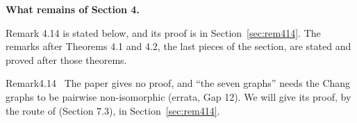 \medskip\noindent\textbf{What remains of Section 4.}

Remark 4.14 is stated below, and its proof is in Section~\ref{sec:rem414}.
The remarks after Theorems 4.1 and 4.2, the last pieces of the section, are stated and proved
after those theorems.

\begin{cgss}{Remark}{4.14}\label{rem:4.14}
 \repair\ The paper gives no proof, and ``the seven graphs'' needs the Chang graphs to be
 pairwise non-isomorphic (errata, Gap 12). We will give its proof, by the
 route of  (Section 7.3), in Section~\ref{sec:rem414}.
\end{cgss}

\endgroup
